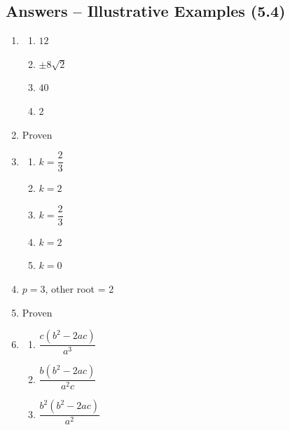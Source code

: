 \documentclass[12pt,a4paper]{article}
\begin{document}
\subsection{Answers -- Illustrative Examples (5.4)}

\begin{enumerate}[label=Example \arabic*.]
    \item 
    \begin{enumerate}[label=(\roman*)]
        \item \( 12 \)
        \item \( \pm 8\sqrt{2} \)
        \item \( 40 \)
        \item \( 2 \)
    \end{enumerate}

    \item Proven

    \item 
    \begin{enumerate}[label=(\roman*)]
        \item \( k = \dfrac{2}{3} \)
        \item \( k = 2 \)
        \item \( k = \dfrac{2}{3} \)
        \item \( k = 2 \)
        \item \( k = 0 \)
    \end{enumerate}

    \item \( p = 3 \), other root = 2

    \item Proven

    \item 
    \begin{enumerate}[label=(\roman*)]
        \item \( \dfrac{c(b^2 - 2ac)}{a^3} \)
        \item \( \dfrac{b(b^2 - 2ac)}{a^2c} \)
        \item \( \dfrac{b^2(b^2 - 2ac)}{a^2} \)
    \end{enumerate}
\end{enumerate}
\end{document}
